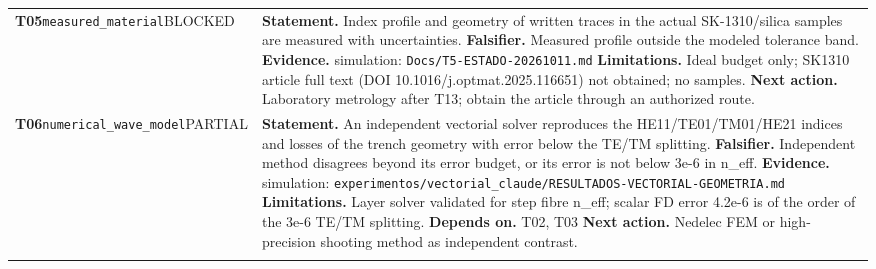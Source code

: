\begin{longtable}{@{}>{\raggedright\arraybackslash}p{2.35cm}>{\raggedright\arraybackslash}p{13.2cm}@{}}
\textbf{T05}\newline \texttt{measured\_\allowbreak{}material}\newline BLOCKED & \textbf{Statement.} Index profile and geometry of written traces in the actual SK-1310/\allowbreak{}silica samples are measured with uncertainties. \newline \textbf{Falsifier.} Measured profile outside the modeled tolerance band. \newline \textbf{Evidence.} simulation: \texttt{Docs/\allowbreak{}T5-ESTADO-20261011.md} \newline \textbf{Limitations.} Ideal budget only; SK1310 article full text (DOI 10.1016/\allowbreak{}j.optmat.2025.116651) not obtained; no samples. \newline \textbf{Next action.} Laboratory metrology after T13; obtain the article through an authorized route. \\ \addlinespace[2pt]
\textbf{T06}\newline \texttt{numerical\_\allowbreak{}wave\_\allowbreak{}model}\newline PARTIAL & \textbf{Statement.} An independent vectorial solver reproduces the HE11/\allowbreak{}TE01/\allowbreak{}TM01/\allowbreak{}HE21 indices and losses of the trench geometry with error below the TE/\allowbreak{}TM splitting. \newline \textbf{Falsifier.} Independent method disagrees beyond its error budget, or its error is not below 3e-6 in n\_\allowbreak{}eff. \newline \textbf{Evidence.} simulation: \texttt{experimentos/\allowbreak{}vectorial\_\allowbreak{}claude/\allowbreak{}RESULTADOS-VECTORIAL-GEOMETRIA.md} \newline \textbf{Limitations.} Layer solver validated for step fibre n\_\allowbreak{}eff; scalar FD error 4.2e-6 is of the order of the 3e-6 TE/\allowbreak{}TM splitting. \newline \textbf{Depends on.} T02, T03 \newline \textbf{Next action.} Nedelec FEM or high-precision shooting method as independent contrast. \\ \addlinespace[2pt]

\end{longtable}
